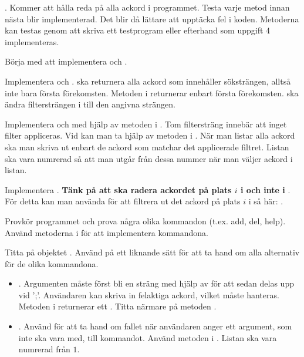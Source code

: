 {\Task {}. Kommer att hålla reda på alla ackord i programmet. Testa varje metod innan nästa blir implementerad. Det blir då lättare att upptäcka fel i koden. Metoderna kan testas genom att skriva ett testprogram eller efterhand som uppgift 4 implementeras.

\Subtask Börja med att implementera  och .

\Subtask Implementera  och .  ska returnera alla ackord som innehåller söksträngen, alltså inte bara första förekomsten. Metoden  i  returnerar enbart första förekomsten.  ska ändra filtersträngen i  till den angivna strängen.

\Subtask Implementera  och  med hjälp av metoden  i . Tom filtersträng innebär att inget filter appliceras. Vid  kan man ta hjälp av metoden  i . När man listar alla ackord ska man skriva ut enbart de ackord som matchar det applicerade filtret. Listan ska vara numrerad så att man utgår från dessa nummer när man väljer ackord i listan.

\Subtask Implementera . \textbf{Tänk på att  ska radera ackordet på plats $i$ i  och inte i }. För detta kan man använda  för att filtrera ut det ackord på plats $i$ i  så här: .

\Task {}

\Subtask Provkör programmet och prova några olika kommandon (t.ex. add, del, help). Använd metoderna i  för att implementera kommandona.

\Subtask Titta på objektet . Använd  på ett liknande sätt för att ta hand om alla alternativ för de olika kommandona.

\begin{itemize}
\item {}. Argumenten måste först bli en sträng med hjälp av  för att sedan delas upp vid ';'. Användaren kan skriva in felaktiga ackord, vilket måste hanteras. Metoden  i  returnerar ett . Titta närmare på metoden .

\item {}. Använd  för att ta hand om fallet när användaren anger ett argument, som inte ska vara med, till kommandot. Använd metoden i . Listan ska vara numrerad från $1$.


\end{itemize}}
